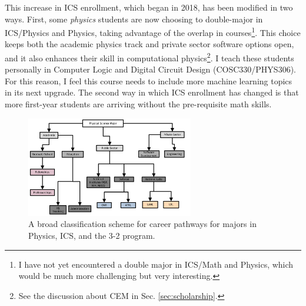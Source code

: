\documentclass[../../main.tex]{subfiles}
\begin{document}
This increase in ICS enrollment, which began in 2018, has been modified in two ways.  First, some \textit{physics} students are now choosing to double-major in ICS/Physics and Physics, taking advantage of the overlap in courses\footnote{I have not yet encountered a double major in ICS/Math and Physics, which would be much more challenging but very interesting.}.  This choice keeps both the academic physics track and private sector software options open, and it also enhances their skill in computational physics\footnote{See the discussion about CEM in Sec. \ref{sec:scholarship}.}.  I teach these students personally in Computer Logic and Digital Circuit Design (COSC330/PHYS306).  For this reason, I feel this course needs to include more machine learning topics in its next upgrade.  The second way in which ICS enrollment has changed is that more first-year students are arriving without the pre-requisite math skills.

\begin{figure}[hb]
\centering
\includegraphics[width=0.65\textwidth]{figures/tree.pdf}
\caption{\label{fig:tree}  A broad classification scheme for career pathways for majors in Physics, ICS, and the 3-2 program.}
\end{figure}
\end{document}
